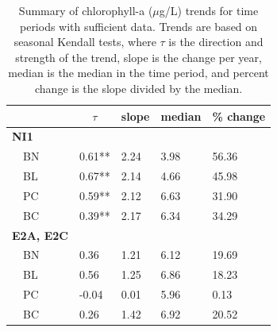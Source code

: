 \documentclass[letterpaper,12pt]{article}\usepackage[]{graphicx}\usepackage[]{color}
\newcommand{\beginsupplement}{%
        \setcounter{table}{0}
        \renewcommand{\thetable}{S\arabic{table}}%
        \setcounter{figure}{0}
        \renewcommand{\thefigure}{S\arabic{figure}}%
     }
\begin{document}
\begin{table}[!tbp]
\caption{Summary of chlorophyll-a ($\mu$g/L) trends for time periods with sufficient data.  Trends are based on seasonal Kendall tests, where $\tau$ is the direction and strength of the trend, slope is the change per year, median is the median in the time period, and percent change is the slope divided by the median.\label{tab:CHLA_Ntrnd}} 
\begin{center}
\begin{tabular}{lllll}
\hline\hline
\multicolumn{1}{l}{}&\multicolumn{1}{c}{$\tau$}&\multicolumn{1}{c}{slope}&\multicolumn{1}{c}{median}&\multicolumn{1}{c}{\% change}\tabularnewline
\hline
{\bfseries NI1}&&&&\tabularnewline
~~BN&0.61**&2.24&3.98&56.36\tabularnewline
~~BL&0.67**&2.14&4.66&45.98\tabularnewline
~~PC&0.59**&2.12&6.63&31.90\tabularnewline
~~BC&0.39**&2.17&6.34&34.29\tabularnewline
\hline
{\bfseries E2A, E2C}&&&&\tabularnewline
~~BN&0.36&1.21&6.12&19.69\tabularnewline
~~BL&0.56&1.25&6.86&18.23\tabularnewline
~~PC&-0.04&0.01&5.96&0.13\tabularnewline
~~BC&0.26&1.42&6.92&20.52\tabularnewline
\hline
\end{tabular}\end{center}
\end{table}

\clearpage

\beginsupplement
\end{document}
